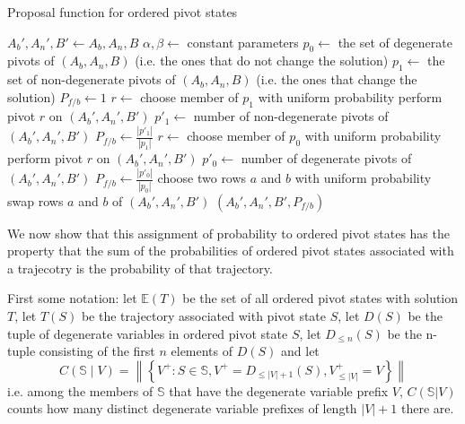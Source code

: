 \documentclass{article}
\begin{document}
\begin{algorithm}
\caption{Proposal function for ordered pivot states}
\label{proposal}
\begin{algorithmic}
 
\State $A_b',A_n',B' \leftarrow A_b,A_n,B$
\State $\alpha, \beta \leftarrow$ constant parameters
\State $p_0 \leftarrow$ the set of degenerate pivots of $(A_b,A_n,B)$ (i.e. the ones that do not change the solution)
\State $p_1 \leftarrow$ the set of non-degenerate pivots of $(A_b,A_n,B)$ (i.e. the ones that change the solution)
\State $P_{f/b} \leftarrow 1$ 
  \State $r \leftarrow$ choose member of $p_1$ with uniform probability
  \State perform pivot $r$ on $(A_b',A_n',B')$
  \State $p'_1 \leftarrow $ number of non-degenerate pivots of $(A_b',A_n',B')$
  \State $P_{f/b} \leftarrow \frac{|p'_1|}{|p_1|}$
  \State $r \leftarrow$ choose member of $p_0$ with uniform probability
  \State perform pivot $r$ on $(A_b',A_n',B')$
  \State $p'_0 \leftarrow $ number of degenerate pivots of $(A_b',A_n',B')$
  \State $P_{f/b} \leftarrow \frac{|p'_0|}{|p_0|}$
\Else
  \State choose two rows $a$ and $b$ with uniform probability
  \State swap rows $a$ and $b$ of $(A_b',A_n',B')$
\EndIf
\State \Return $(A_b',A_n',B',P_{f/b})$
\EndFunction
\end{algorithmic}
\end{algorithm}



We now show that this assignment of probability to ordered pivot states has the property that the sum of the probabilities of ordered pivot states associated with a trajecotry is the probability of that trajectory.

First some notation: let $\mathbb{E}(T)$ be the set of all ordered pivot states with solution $T$, let $T(S)$ be the trajectory associated with pivot state $S$, let $D(S)$ be the tuple of degenerate variables in ordered pivot state $S$, let $D_{\le n}(S)$ be the n-tuple consisting of the first $n$ elements of $D(S)$ and let
\begin{equation}
C(\mathbb{S} \mid V) = \left\|\left\{ V^+ :  S \in \mathbb{S}, V^+ = D_{\le |V|+1}(S), V^+_{\le |V|}=V \right\}\right\|
\label{count}
\end{equation}
i.e. among the members of $\mathbb{S}$ that have the degenerate variable prefix $V$, $C(\mathbb{S}|V)$ counts how many distinct degenerate variable prefixes of length $|V|+1$ there are.
\end{document}
